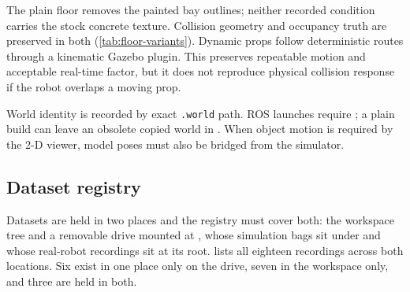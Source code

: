 The plain floor removes the painted bay outlines; neither recorded condition
carries the stock concrete texture. Collision geometry and occupancy truth are
preserved in both (\cref{tab:floor-variants}). Dynamic props follow
deterministic routes through a kinematic Gazebo plugin. This preserves repeatable
motion and acceptable real-time factor, but it does not reproduce physical
collision response if the robot overlaps a moving prop.

World identity is recorded by exact \texttt{.world} path. ROS launches require
; a plain build can leave an obsolete copied
world in . When object motion is required by the 2-D viewer, model
poses must also be bridged from the simulator.

\subsection{Dataset registry}

Datasets are held in two places and the registry must cover both: the workspace
tree  and a removable drive mounted at
, whose simulation bags sit under
 and whose real-robot recordings sit at its root.
 lists all eighteen recordings across both locations.
Six exist in one place only on the drive, seven in the workspace only, and three
are held in both.

